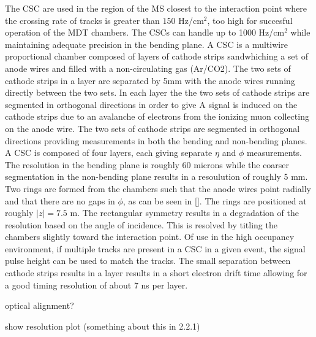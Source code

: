 The CSC are used in the region of the MS closest to the interaction
point where the crossing rate of tracks 
is greater than $150$ Hz/cm$^2$, 
too high for succesful operation of the MDT chambers.
The CSCs can handle up to 1000 Hz/cm$^2$
while maintaining adequate  precision in the bending plane.
A CSC is a multiwire proportional chamber
composed of layers of cathode strips sandwhiching 
a set of anode wires and filled with a non-circulating gas (Ar/CO2).
The two sets of cathode strips in a layer are separated by 5mm
with the anode wires running directly between the two sets.
In each layer the the two sets of cathode strips are segmented in
orthogonal directions in order to give 
A signal is induced on the cathode strips due to an avalanche
of electrons from the ionizing muon collecting on the anode wire.
The two sets of cathode strips are segmented in orthogonal directions
providing measurements in both the bending and non-bending planes. 
A CSC is composed of four layers, each giving separate $\eta$ and
$\phi$ measurements.
The resolution in the bending plane is roughly 60 microns
while the coarser segmentation in the non-bending plane 
results in a  resoulution of  roughly 5 mm.
Two rings are formed from the chambers such that the anode wires
point radially and that there are no gaps in $\phi$, as
can be seen in \fig\ref{}. The rings are positioned
at roughly $|z|=7.5$ m. The rectangular symmetry 
results in a degradation of the resolution based on the angle of incidence.
This is resolved by titling the chambers slightly toward the interaction point.
Of use in the high occupancy environment, 
if multiple tracks are present in a CSC in a given event, 
the signal pulse height can be used to match the tracks.
The small separation between cathode strips results in a layer
results in a short electron drift time allowing for a good
timing resolution of about 7 ns per layer.

optical alignment?

show resolution plot (something about this in 2.2.1)

